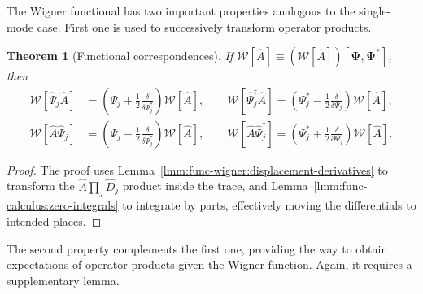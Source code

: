 \documentclass[12pt,aip,jmp,amssymb,amsmath]{revtex4-1}
\newtheorem{theorem}{Theorem}
\begin{document}
The Wigner functional has two important properties analogous to the single-mode case.
First one is used to successively transform operator products.

\begin{theorem}[Functional correspondences]
\label{thm:func-wigner:correspondences}
    If $\mathcal{W} [ \hat{A} ] \equiv (\mathcal{W} [ \hat{A} ]) [\boldsymbol{\Psi}, \boldsymbol{\Psi}^*]$, then
    \begin{eqnarray*}
        \mathcal{W} [ \hat{\Psi}_j \hat{A} ]
            & = \left( \Psi_j + \frac{1}{2} \frac{\delta}{\delta \Psi_j^*} \right) \mathcal{W}[\hat{A}],
        \qquad
        \mathcal{W} [ \hat{\Psi}_j^\dagger \hat{A} ]
            = \left( \Psi_j^* - \frac{1}{2} \frac{\delta}{\delta \Psi_j} \right) \mathcal{W}[\hat{A}], \\
        \mathcal{W} [ \hat{A} \hat{\Psi}_j ]
            & = \left( \Psi_j - \frac{1}{2} \frac{\delta}{\delta \Psi_j^*} \right) \mathcal{W}[\hat{A}],
        \qquad
        \mathcal{W} [ \hat{A} \hat{\Psi}_j^\dagger ]
            = \left( \Psi_j^* + \frac{1}{2} \frac{\delta}{\partial \Psi_j} \right) \mathcal{W}[\hat{A}].
    \end{eqnarray*}
\end{theorem}
\begin{proof}
The proof uses Lemma~\ref{lmm:func-wigner:displacement-derivatives} to transform the $\hat{A} \prod_j \hat{D}_j$ product inside the trace, and Lemma~\ref{lmm:func-calculus:zero-integrals} to integrate by parts, effectively moving the differentials to intended places.
\end{proof}

The second property complements the first one, providing the way to obtain expectations of operator products given the Wigner function.
Again, it requires a supplementary lemma.
\end{document}
